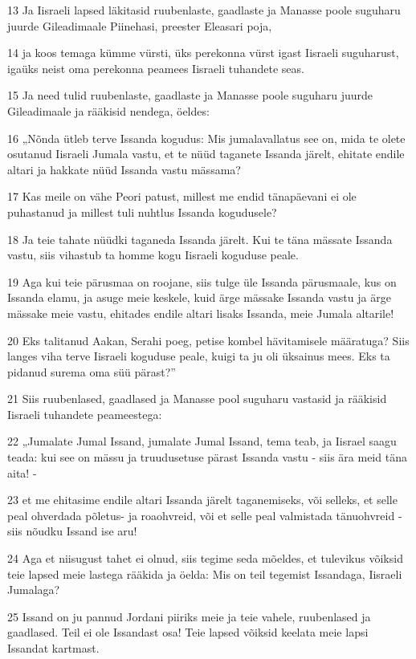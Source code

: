 \par 13 Ja Iisraeli lapsed läkitasid ruubenlaste, gaadlaste ja Manasse poole suguharu juurde Gileadimaale Piinehasi, preester Eleasari poja,
\par 14 ja koos temaga kümme vürsti, üks perekonna vürst igast Iisraeli suguharust, igaüks neist oma perekonna peamees Iisraeli tuhandete seas.
\par 15 Ja need tulid ruubenlaste, gaadlaste ja Manasse poole suguharu juurde Gileadimaale ja rääkisid nendega, öeldes:
\par 16 „Nõnda ütleb terve Issanda kogudus: Mis jumalavallatus see on, mida te olete osutanud Iisraeli Jumala vastu, et te nüüd taganete Issanda järelt, ehitate endile altari ja hakkate nüüd Issanda vastu mässama?
\par 17 Kas meile on vähe Peori patust, millest me endid tänapäevani ei ole puhastanud ja millest tuli nuhtlus Issanda kogudusele?
\par 18 Ja teie tahate nüüdki taganeda Issanda järelt. Kui te täna mässate Issanda vastu, siis vihastub ta homme kogu Iisraeli koguduse peale.
\par 19 Aga kui teie pärusmaa on roojane, siis tulge üle Issanda pärusmaale, kus on Issanda elamu, ja asuge meie keskele, kuid ärge mässake Issanda vastu ja ärge mässake meie vastu, ehitades endile altari lisaks Issanda, meie Jumala altarile!
\par 20 Eks talitanud Aakan, Serahi poeg, petise kombel hävitamisele määratuga? Siis langes viha terve Iisraeli koguduse peale, kuigi ta ju oli üksainus mees. Eks ta pidanud surema oma süü pärast?”
\par 21 Siis ruubenlased, gaadlased ja Manasse pool suguharu vastasid ja rääkisid Iisraeli tuhandete peameestega:
\par 22 „Jumalate Jumal Issand, jumalate Jumal Issand, tema teab, ja Iisrael saagu teada: kui see on mässu ja truudusetuse pärast Issanda vastu - siis ära meid täna aita! -
\par 23 et me ehitasime endile altari Issanda järelt taganemiseks, või selleks, et selle peal ohverdada põletus- ja roaohvreid, või et selle peal valmistada tänuohvreid - siis nõudku Issand ise aru!
\par 24 Aga et niisugust tahet ei olnud, siis tegime seda mõeldes, et tulevikus võiksid teie lapsed meie lastega rääkida ja öelda: Mis on teil tegemist Issandaga, Iisraeli Jumalaga?
\par 25 Issand on ju pannud Jordani piiriks meie ja teie vahele, ruubenlased ja gaadlased. Teil ei ole Issandast osa! Teie lapsed võiksid keelata meie lapsi Issandat kartmast.
